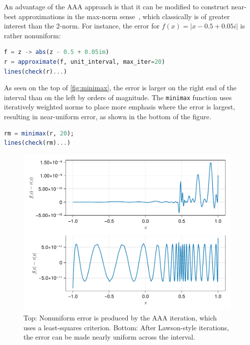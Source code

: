 \documentclass{juliacon}
\begin{document}
An advantage of the AAA approach is that it can be modified to construct near-best approximations in the max-norm sense~\cite{nakatsukasaAlgorithmReal2020}, which classically is of greater interest than the 2-norm. For instance, the error for $f(x)=|x-0.5 + 0.05i|$ is rather nonuniform:
\begin{lstlisting}[language = Julia, caption={Continuum AAA for $|x-0.5 + 0.05i|$.}]
f = z -> abs(z - 0.5 + 0.05im)
r = approximate(f, unit_interval, max_iter=20)
lines(check(r)...)
\end{lstlisting}
As seen on the top of \autoref{fig:minimax}, the error is larger on the right end of the interval than on the left by orders of magnitude. The \verb|minimax| function uses iteratively weighted norms to place more emphasis where the error is largest, resulting in near-uniform error, as shown in the bottom of the figure.
\begin{lstlisting}[language = Julia, caption={Minimax AAA for $|x-0.5 + 0.05i|$.}]
rm = minimax(r, 20);
lines(check(rm)...)
\end{lstlisting}

\begin{figure}
\centering
\includegraphics[width=\columnwidth]{minimax.pdf}
\caption{Top: Nonuniform error is produced by the AAA iteration, which uses a least-squares criterion. Bottom: After Lawson-style iterations, the error can be made nearly uniform across the interval.}
\label{fig:minimax}
\end{figure}
\end{document}
